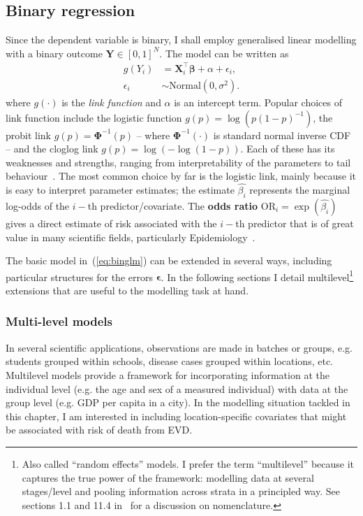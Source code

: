 \subsection{Binary regression}
\label{sec:binreg}
Since the dependent variable is binary, I shall employ generalised linear modelling with a binary outcome $\boldsymbol Y \in [0, 1]^N$.
The model can be written as 
\begin{align}
 \label{eq:binglm}
 g(Y_i) &= \boldsymbol X_i^\intercal \boldsymbol\beta + \alpha  + \epsilon_i,\\
 \epsilon_i &\sim \text{Normal}(0, \sigma^2).
\end{align} 
where $g(\cdot)$ is the \textit{link function} and $\alpha$ is an intercept term.
Popular choices of link function include the logistic function $g(p) = \log\left(p(1-p)^{-1} \right)$, the probit link $g(p) = \boldsymbol\Phi^{-1}(p)$ -- where  $\boldsymbol\Phi^{-1}(\cdot)$ is standard normal inverse CDF -- and the cloglog link $g(p) = \log(-\log(1-p))$.
Each of these has its weaknesses and strengths, ranging from interpretability of the parameters to tail behaviour~\citep{Czado2006}.
The most common choice by far is the logistic link, mainly because it is easy to interpret parameter estimates; the estimate $\hat{\beta_i}$ represents the marginal log-odds of the $i-$th predictor/covariate.
The \textbf{odds ratio} $\text{OR}_i = \exp(\hat{\beta_i})$ gives a direct estimate of risk associated with the $i-$th predictor that is of great value in many scientific fields, particularly Epidemiology~\citep{Schmidt2008}.

The basic model in~(\ref{eq:binglm}) can be extended in several ways, including particular structures for the errors $\boldsymbol\epsilon$. 
In the following sections I detail multilevel\footnote{Also called ``random effects'' models. I prefer the term ``multilevel'' because it captures the true power of the framework: modelling data at several stages/level and pooling information across strata in a principled way. See sections 1.1 and 11.4 in~\cite{Hill2007} for a discussion on nomenclature.} extensions that are useful to the modelling task at hand.

\subsubsection{Multi-level models}
\label{sec:multilevel}

In several scientific applications, observations are made in batches or groups, e.g. students grouped within schools, disease cases grouped within locations, etc.
Multilevel models provide a framework for incorporating information at the individual level (e.g. the age and sex of a measured individual) with data at the group level (e.g. GDP per capita in a city)\citep{Hill2007}.
In the modelling situation tackled in this chapter, I am interested in including location-specific covariates that might be associated with risk of death from EVD.

